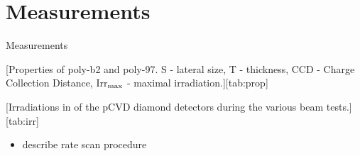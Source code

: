 \section{Measurements}
\begin{frame}{Measurements}

  [Properties of poly-b2 and poly-97. S - lateral size, T - thickness, CCD - Charge Collection Distance, Irr$_{\text{max}}$ - maximal irradiation.][tab:prop]
    
  [Irradiations in \SI{}{\ncm} of the pCVD diamond detectors during the various beam tests.][tab:irr]
    
  \begin{itemize}
    \item describe rate scan procedure
  \end{itemize}
\end{frame}
